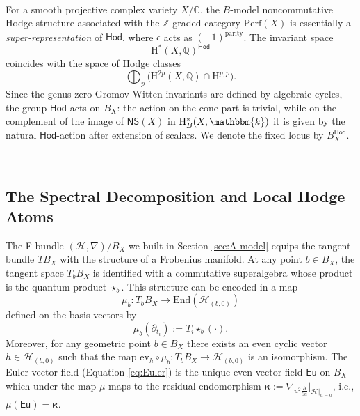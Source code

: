 \documentclass[12pt,a4paper]{amsart}
\theoremstyle{definition}
\theoremstyle{remark}
\newcommand{\Q}{\mathbb{Q}}
\newcommand{\Z}{\mathbb{Z}}
\newcommand{\C}{\mathbb{C}}
\begin{document}

\ 

For a smooth projective complex variety $X/\C$, the $B$-model noncommutative Hodge structure associated with the $\Z$-graded category $\mathrm{Perf}(X)$ is essentially a \emph{super-representation} of $\mathsf{Hod}$, where $\epsilon$ acts as $(-1)^{\mathrm{parity}}$. The invariant space
\[
\mathrm{H}^{\ast}(X,\Q)^{\mathsf{Hod}}
\]
coincides with the space of Hodge classes
\[
\bigoplus_{p}\bigl(\mathrm{H}^{2p}(X,\Q)\cap \mathrm{H}^{p,p}\bigr).
\]
Since the genus-zero Gromov-Witten invariants are defined by algebraic cycles, the group $\mathsf{Hod}$ acts on $B_X$: the action on the cone part is trivial, while on the complement of the image of $\mathsf{NS}(X)$ in $\mathrm{H}^{\ast}_B(X,\mathbbm{k})$ it is given by the natural $\mathsf{Hod}$-action after extension of scalars. We denote the fixed locus by $B_X^{\mathsf{Hod}}$.

\ 

\subsection{The Spectral Decomposition and Local Hodge Atoms}
\label{sec:local-hodge-atoms}

The F-bundle $(\mathcal H,\nabla)/B_X$ we built in Section \ref{sec:A-model} equips \cite[Section 3.4]{katzarkovpantevyu} the tangent bundle $TB_X$ with the structure of a Frobenius manifold. At any point $b \in B_X$, the tangent space $T_b B_X$ is identified with a commutative superalgebra whose product is the quantum product $\star_b$. This structure can be encoded in a map
    \[\mu_b: T_b B_X \rightarrow \mathrm{End}(\mathcal H_{(b,0)})\]
defined on the basis vectors by
    \[\mu_b(\partial_{t_i}) := T_i \star_b (\cdot).\]
Moreover, for any geometric point $b \in B_X$ there exists an {even cyclic vector} $h\in \mathcal H_{(b,0)}$ such that the map $\mathrm{ev}_h\circ \mu_b:T_bB_X\rightarrow \mathcal H_{(b,0)}$ is an isomorphism. The Euler vector field (Equation \eqref{eq:Euler}) is the unique even vector field $\mathsf{Eu}$ on $B_X$ which under the map $\mu$ maps to the residual endomorphism $\boldsymbol\kappa:=\nabla_{u^2\tfrac{\partial}{\partial u}}\Big|_{\mathcal H|_{u=0}}$, i.e., $\mu(\mathsf{Eu})=\boldsymbol\kappa$.
\end{document}
